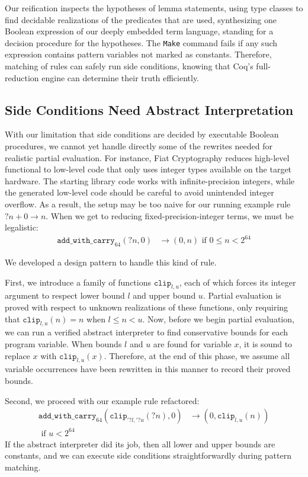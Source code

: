 \documentclass[sigplan,10pt,review,anonymous]{acmart}\settopmatter{printfolios=true,printccs=false,printacmref=false}
\begin{document}
Our reification inspects the hypotheses of lemma statements, using type classes to find decidable realizations of the predicates that are used, synthesizing one Boolean expression of our deeply embedded term language, standing for a decision procedure for the hypotheses.
The \texttt{Make} command fails if any such expression contains pattern variables not marked as constants.
Therefore, matching of rules can safely run side conditions, knowing that Coq's full-reduction engine can determine their truth efficiently.

\subsection{Side Conditions Need Abstract Interpretation} \label{sec:abs-int}

With our limitation that side conditions are decided by executable Boolean procedures, we cannot yet handle directly some of the rewrites needed for realistic partial evaluation.
For instance, Fiat Cryptography reduces high-level functional to low-level code that only uses integer types available on the target hardware.
The starting library code works with infinite-precision integers, while the generated low-level code should be careful to avoid unintended integer overflow.
As a result, the setup may be too naive for our running example rule $?n + 0 \to n$.
When we get to reducing fixed-precision-integer terms, we must be legalistic:
\begin{align*}
  \texttt{add\_with\_carry}_{64}(?n, 0) & \to (0, n)\text{ if }0 \le n < 2^{64}
\end{align*}

We developed a design pattern to handle this kind of rule.

First, we introduce a family of functions $\texttt{clip}_{l,u}$, each of which forces its integer argument to respect lower bound $l$ and upper bound $u$.
Partial evaluation is proved with respect to unknown realizations of these functions, only requiring that $\texttt{clip}_{l, u}(n) = n$ when $l \leq n < u$.
Now, before we begin partial evaluation, we can run a verified abstract interpreter to find conservative bounds for each program variable.
When bounds $l$ and $u$ are found for variable $x$, it is sound to replace $x$ with $\texttt{clip}_{l,u}(x)$.
Therefore, at the end of this phase, we assume all variable occurrences have been rewritten in this manner to record their proved bounds.

Second, we proceed with our example rule refactored:
\begin{align*}
  \texttt{add\_with\_carry}_{64}(\texttt{clip}_{'?l,'?u}(?n), 0) & \to (0, \texttt{clip}_{l,u}(n)) \\
  \text{ if }u < 2^{64}
\end{align*}
If the abstract interpreter did its job, then all lower and upper bounds are constants, and we can execute side conditions straightforwardly during pattern matching.
\end{document}
